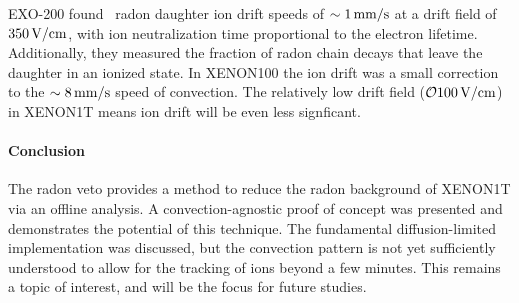 EXO-200 found~\cite{Albert:2015vma} radon daughter ion drift speeds of $\sim 1\,\mathrm{mm/s}$ at a drift field of $350\,\mathrm{V/cm}$, with ion neutralization time proportional to the electron lifetime. Additionally, they measured the fraction of radon chain decays that leave the daughter in an ionized state. In XENON100 the ion drift was a small correction to the $\sim 8\,\mathrm{mm/s}$ speed of convection. The relatively low drift field ($\mathcal{O}{100}\,\mathrm{V/cm}$) in XENON1T means ion drift will be even less signficant.

\paragraph{Conclusion}

The radon veto provides a method to reduce the radon background of XENON1T via an offline analysis. A convection-agnostic proof of concept was presented and demonstrates the potential of this technique. The fundamental diffusion-limited implementation was discussed, but the convection pattern is not yet sufficiently understood to allow for the tracking of ions beyond a few minutes. This remains a topic of interest, and will be the focus for future studies.
